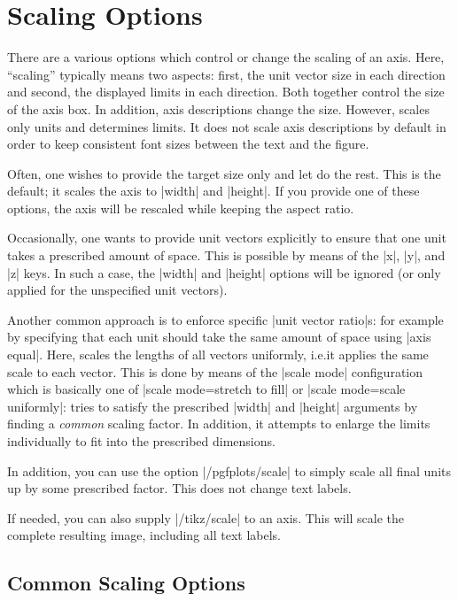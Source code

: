 
\section[reference.scaling]{Scaling Options}

There are a various options which control or change the scaling of an axis.
Here, ``scaling'' typically means two aspects: first, the unit vector size in
each direction and second, the displayed limits in each direction. Both
together control the size of the axis box. In addition, axis descriptions
change the size. However, \PGFPlots{} scales only units and determines limits.
It does not scale axis descriptions by default in order to keep consistent font
sizes between the text and the figure.

Often, one wishes to provide the target size only and let \PGFPlots{} do the
rest. This is the default; it scales the axis to |width| and |height|. If you
provide one of these options, the axis will be rescaled while keeping the
aspect ratio.

Occasionally, one wants to provide unit vectors explicitly to ensure that one
unit takes a prescribed amount of space. This is possible by means of the |x|,
|y|, and |z| keys. In such a case, the |width| and |height| options will be
ignored (or only applied for the unspecified unit vectors).

Another common approach is to enforce specific |unit vector ratio|s: for
example by specifying that each unit should take the same amount of space using
|axis equal|. Here, \PGFPlots{} scales the lengths of all vectors uniformly,
i.e.\@ it applies the same scale to each vector. This is done by means of the
|scale mode| configuration which is basically one of
|scale mode=stretch to fill| or |scale mode=scale uniformly|: \PGFPlots{} tries
to satisfy the prescribed |width| and |height| arguments by finding a
\emph{common} scaling factor. In addition, it attempts to enlarge the limits
individually to fit into the prescribed dimensions.

In addition, you can use the option |/pgfplots/scale| to simply scale all final
units up by some prescribed factor. This does not change text labels.

If needed, you can also supply |/tikz/scale| to an axis. This will scale the
complete resulting image, including all text labels.


\subsection{Common Scaling Options}

